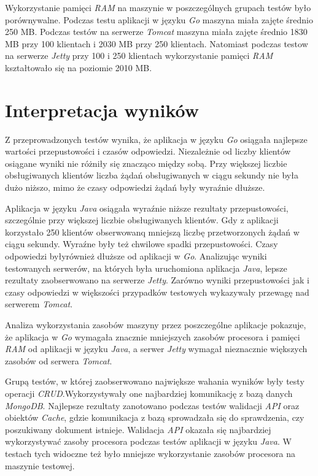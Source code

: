  Wykorzystanie pamięci \textsl{RAM} na maszynie  w poszczególnych grupach testów było porównywalne.  Podczas testu aplikacji w języku \textsl{Go} maszyna miała zajęte średnio 250 MB. Podczas testów na  serwerze \textsl{Tomcat} maszyna  miała zajęte średnio  1830 MB przy  100 klientach i 2030 MB przy 250 klientach. Natomiast podczas testow na serwerze \textsl{Jetty} przy 100 i 250 klientach wykorzystanie pamięci \textsl{RAM} kształtowało się na poziomie 2010 MB. 

% 
\clearpage

\newpage
\section{Interpretacja wyników}

Z przeprowadzonych testów wynika, że aplikacja w języku \textsl{Go} osiągała najlepsze wartości przepustowości i czasów odpowiedzi. Niezależnie od liczby klientów osiągane wyniki nie różniły się znacząco między sobą. Przy większej liczbie obsługiwanych klientów liczba żądań obsługiwanych w ciągu sekundy nie była dużo niższo, mimo że czasy odpowiedzi żądań były wyraźnie dłuższe.

Aplikacja w języku \textsl{Java} osiągała wyraźnie niższe rezultaty przepustowości, szczególnie przy większej liczbie obsługiwanych klientów. Gdy z aplikacji korzystało 250 klientów obserwowanq  mniejszą liczbę przetworzonych żądań w ciągu sekundy. Wyraźne były też chwilowe spadki przepustowości. Czasy odpowiedzi byłyrównież dłuższe od aplikacji w \textsl{Go}. Analizując wyniki testowanych serwerów, na których była uruchomiona aplikacja \textsl{Java}, lepsze rezultaty zaobserwowano na serwerze \textsl{Jetty}. Zarówno wyniki przepustowości jak i czasy odpowiedzi w większości przypadków testowych wykazywały przewagę nad serwerem \textsl{Tomcat}. 

Analiza wykorzystania zasobów maszyny przez poszczególne aplikacje pokazuje, że aplikacja w \textsl{Go} wymagała znacznie mniejszych zasobów procesora i pamięci \textsl{RAM} od aplikacji w języku \textsl{Java}, a serwer \textsl{Jetty}  wymagał nieznacznie większych zasobów  od serwera \textsl{Tomcat}.

Grupą testów, w której zaobserwowano największe  wahania wyników były testy operacji \textsl{CRUD}.Wykorzystywały one  najbardziej  komunikację z bazą danych \textsl{MongoDB}. Najlepsze rezultaty zanotowano podczas testów walidacji \textsl{API} oraz obiektów \textsl{Cache}, gdzie komunikacja z bazą sprowadzała się do sprawdzenia, czy poszukiwany dokument istnieje. Walidacja \textsl{API} okazała się najbardziej wykorzystywać zasoby procesora podczas testów aplikacji w języku \textsl{Java}. W testach tych widoczne też było mniejsze wykorzystanie zasobów procesora na maszynie testowej.

